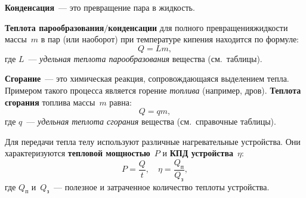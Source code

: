 \documentclass[main.tex]{subfiles}
\begin{document}
\begin{itemize}
    \textbf{Конденсация}~--- это превращение пара в жидкость. 

    \textbf{Теплота парообразования$/$конденсации} для полного превращения\linebreak жидкости массы~$m$ в пар (или наоборот) при температуре кипения находится по формуле:
    \begin{equation}
        Q=L m,
    \end{equation}
    где $L$~--- \emph{удельная теплота парообразования} вещества (см.~таблицы).

\end{itemize}

\textbf{Сгорание}~--- это химическая реакция, сопровождающаяся выделением тепла. Примером такого процесса является горение \emph{топлива} (например, дров). \textbf{Теплота сгорания} топлива массы~$m$ равна:
    \begin{equation}
        Q=q m,
    \end{equation}
    где $q$~--- \emph{удельная теплота сгорания} вещества (см.~справочные таблицы).

Для передачи тепла телу используют различные нагревательные устройства. Они характеризуются \textbf{тепловой мощностью}~$P$ и \textbf{КПД устройства}~$\eta$:
\begin{equation}
    P=\frac{Q}{t},\quad \eta=\frac{Q_\text{п}}{Q_\text{з}},
\end{equation}
где $Q_\text{п}$ и~$Q_\text{з}$~--- полезное и затраченное количество теплоты устройства.





















 
\end{document}
